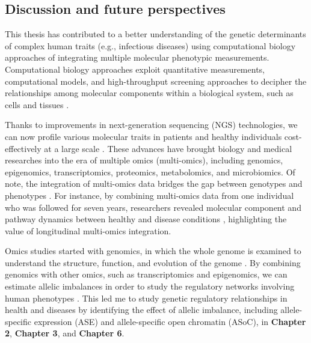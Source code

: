 \documentclass{book}
\begin{document}
\renewcommand{\thetable}{\textbf{Table \arabic{chapter}.\arabic{table}}}
\renewcommand{\thefigure}{\textbf{Figure \arabic{chapter}.\arabic{figure}}}

\begin{refsection} %

\chapter{Discussion and future perspectives}

\newpage
This thesis has contributed to a better understanding of the genetic determinants of complex human traits (e.g., infectious diseases) using computational biology approaches of integrating multiple molecular phenotypic measurements.
Computational biology approaches exploit quantitative measurements, computational models, and high-throughput screening approaches to decipher the relationships among molecular components within a biological system, such as cells and tissues \cite{Tavassoly2018Systems}.

Thanks to improvements in next-generation sequencing (NGS) technologies, we can now profile various molecular traits in patients and healthy individuals cost-effectively at a large scale \cite{Levy2016Advancements}.
These advances have brought biology and medical researches into the era of multiple omics (multi-omics), including genomics, epigenomics, transcriptomics, proteomics, metabolomics, and microbiomics.
Of note, the integration of multi-omics data bridges the gap between genotypes and phenotypes \cite{Hasin2017Multi}.
For instance, by combining multi-omics data from one individual who was followed for seven years, researchers revealed molecular component and pathway dynamics between healthy and disease conditions \cite{Chen2012Personal}, highlighting the value of longitudinal multi-omics integration.

Omics studies started with genomics, in which the whole genome is examined to understand the structure, function, and evolution of the genome \cite{Oudelaar2020The,Giallourakis2005DISEASE,Cañestro2007Evolutionary}.
By combining genomics with other omics, such as transcriptomics and epigenomics, we can estimate allelic imbalances in order to study the regulatory networks involving human phenotypes \cite{Cleary2021Perspectives}.
This led me to study genetic regulatory relationships in health and diseases by identifying the effect of allelic imbalance, including allele-specific expression (ASE) and allele-specific open chromatin (ASoC), in \textbf{Chapter 2}, \textbf{Chapter 3}, and \textbf{Chapter 6}.


\end{refsection}
\end{document}

